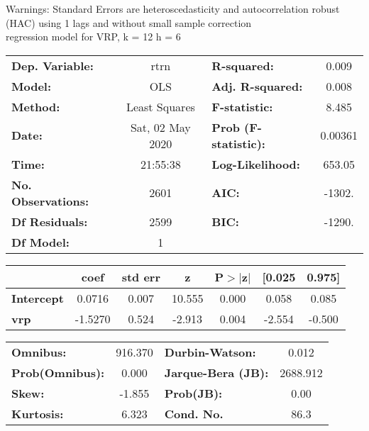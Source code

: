 Warnings: \newline
 [1] Standard Errors are heteroscedasticity and autocorrelation robust (HAC) using 1 lags and without small sample correction\\ 

regression model for VRP, k = 12 h = 6\begin{center}
\begin{tabular}{lclc}
\toprule
\textbf{Dep. Variable:}    &       rtrn       & \textbf{  R-squared:         } &     0.009   \\
\textbf{Model:}            &       OLS        & \textbf{  Adj. R-squared:    } &     0.008   \\
\textbf{Method:}           &  Least Squares   & \textbf{  F-statistic:       } &     8.485   \\
\textbf{Date:}             & Sat, 02 May 2020 & \textbf{  Prob (F-statistic):} &  0.00361    \\
\textbf{Time:}             &     21:55:38     & \textbf{  Log-Likelihood:    } &    653.05   \\
\textbf{No. Observations:} &        2601      & \textbf{  AIC:               } &    -1302.   \\
\textbf{Df Residuals:}     &        2599      & \textbf{  BIC:               } &    -1290.   \\
\textbf{Df Model:}         &           1      & \textbf{                     } &             \\
\bottomrule
\end{tabular}
\begin{tabular}{lcccccc}
                   & \textbf{coef} & \textbf{std err} & \textbf{z} & \textbf{P$> |$z$|$} & \textbf{[0.025} & \textbf{0.975]}  \\
\midrule
\textbf{Intercept} &       0.0716  &        0.007     &    10.555  &         0.000        &        0.058    &        0.085     \\
\textbf{vrp}       &      -1.5270  &        0.524     &    -2.913  &         0.004        &       -2.554    &       -0.500     \\
\bottomrule
\end{tabular}
\begin{tabular}{lclc}
\textbf{Omnibus:}       & 916.370 & \textbf{  Durbin-Watson:     } &    0.012  \\
\textbf{Prob(Omnibus):} &   0.000 & \textbf{  Jarque-Bera (JB):  } & 2688.912  \\
\textbf{Skew:}          &  -1.855 & \textbf{  Prob(JB):          } &     0.00  \\
\textbf{Kurtosis:}      &   6.323 & \textbf{  Cond. No.          } &     86.3  \\
\bottomrule
\end{tabular}
\end{center}

